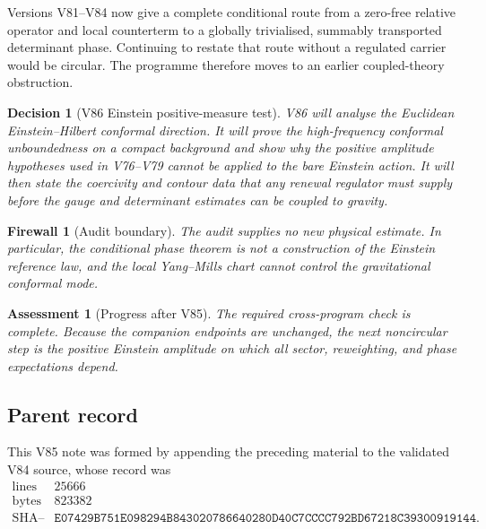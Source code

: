 \documentclass[11pt]{article}
\newtheorem{assessment}[theorem]{Assessment}
\newtheorem{firewall}[theorem]{Firewall}
\newtheorem{decision}[theorem]{Decision}
\begin{document}
Versions V81--V84 now give a complete conditional route from a
zero-free relative operator and local counterterm to a globally
trivialised, summably transported determinant phase.  Continuing to
restate that route without a regulated carrier would be circular.
The programme therefore moves to an earlier coupled-theory
obstruction.

\begin{decision}[V86 Einstein positive-measure test]
\label{dec:v11v85-next}
V86 will analyse the Euclidean Einstein--Hilbert conformal direction.
It will prove the high-frequency conformal unboundedness on a compact
background and show why the positive amplitude hypotheses used in
V76--V79 cannot be applied to the bare Einstein action.  It will then
state the coercivity and contour data that any renewal regulator must
supply before the gauge and determinant estimates can be coupled to
gravity.
\end{decision}

\begin{firewall}[Audit boundary]
\label{fire:v11v85-boundary}
The audit supplies no new physical estimate.  In particular, the
conditional phase theorem is not a construction of the Einstein
reference law, and the local Yang--Mills chart cannot control the
gravitational conformal mode.
\end{firewall}

\begin{assessment}[Progress after V85]
\label{ass:v11v85-status}
The required cross-program check is complete.  Because the companion
endpoints are unchanged, the next noncircular step is the positive
Einstein amplitude on which all sector, reweighting, and phase
expectations depend.
\end{assessment}

\subsection{Parent record}

This V85 note was formed by appending the preceding material to the
validated V84 source, whose record was
\[
\begin{array}{c|c}
\text{lines}&25666\\
\text{bytes}&823382\\
\text{SHA--256}&
\texttt{E07429B751E098294B843020786640280D40C7CCCC792BD67218C39300919144}.
\end{array}                                                     \tag{85.2}
\]
\end{document}
